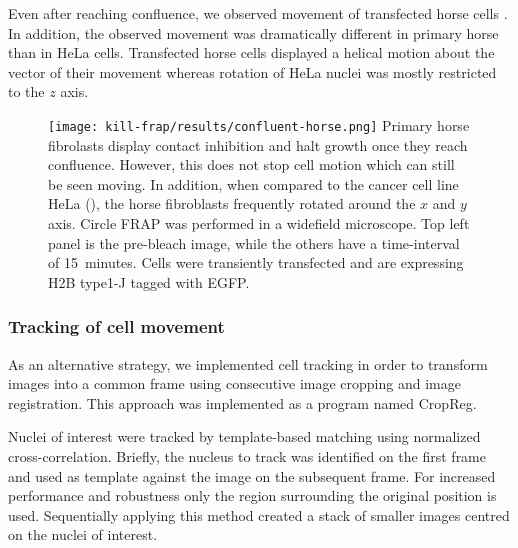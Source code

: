       Even after reaching confluence, we observed movement of transfected horse cells . 
	  In addition, the observed movement was dramatically different in primary horse than in HeLa cells.
	  Transfected horse cells displayed a helical motion about the vector of their movement 
	  whereas rotation of HeLa nuclei was mostly restricted to the $z$ axis.

      \begin{figure}
        \centering
        \texttt{[image: kill-frap/results/confluent-horse.png]}
          {
            Primary horse fibrolasts display contact inhibition and halt growth
            once they reach confluence. However, this does not stop cell
            motion which can still be seen moving. In addition, when compared
            to the cancer cell line HeLa (),
            the horse fibroblasts frequently rotated around the $x$ and $y$
            axis. Circle FRAP was performed in a widefield microscope.
            Top left panel is the pre-bleach image, while the others have a
            time-interval of 15~minutes. Cells were transiently transfected
            and are expressing H2B type1-J tagged with EGFP.
          }
        \label{fig:kill-frap:confluent-horse}
      \end{figure}

    \subsubsection{Tracking of cell movement}

      As an alternative strategy, we implemented cell tracking 
	  in order to transform images into a common frame using 
	  consecutive image cropping and image registration. 
	  This approach was implemented as a program named CropReg.

      Nuclei of interest were tracked by template-based matching using normalized cross-correlation. 
	  Briefly, the nucleus to track was identified on the first frame and 
	  used as template against the image on the subsequent frame.
	  For increased performance and robustness only the region surrounding the original position is used. 
	  Sequentially applying this method created a stack of smaller images centred on the nuclei of interest.

